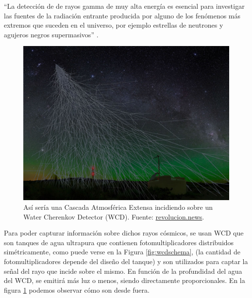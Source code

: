 \enquote{La detección de de rayos gamma de muy alta energía es esencial para investigar las fuentes de la radiación entrante producida por alguno de los fenómenos más extremos que suceden en el universo, por ejemplo estrellas de neutrones y agujeros negros supermasivos} \cite{gonzalez2021tackling}.

\begin{figure}[H]
	\includegraphics[scale=.3]{imagenes/01_Introduccion/EAS.jpg}
	\centering
	\caption{Así sería una Cascada Atmosférica Extensa incidiendo sobre un Water Cherenkov Detector (WCD). Fuente: \href{https://revolucion.news/cienciario.mx/los-rayos-cosmicos-de-muy-alta-energia-vienen-de-fuera-de-la-via-lactea/}{revolucion.news}.}
	\label{fig:wcd}
\end{figure}

Para poder capturar información sobre dichos rayos cósmicos, se usan WCD que son tanques de agua ultrapura que contienen fotomultiplicadores distribuidos simétricamente, como puede verse en la Figura \ref{fig:wcdschema}, (la cantidad de fotomultiplicadores depende del diseño del tanque) y son utilizados para captar la señal del rayo que incide sobre el mismo. En función de la profundidad del agua del WCD, se emitirá más luz o menos, siendo directamente proporcionales. En la figura \ref{fig:wcd} podemos observar cómo son desde fuera.\newline

